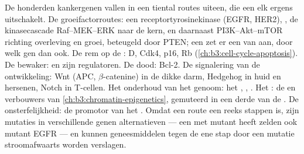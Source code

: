 \begin{proposition}\label{prop:b3:cancer-biology:pathways}
De honderden kankergenen vallen in een tiental routes uiteen, die een
 elk ergens uitschakelt. De groeifactorroutes: een
receptortyrosinekinase (EGFR, HER2), , de kinasecascade
Raf--MEK--ERK naar de kern, en daarnaast PI3K--Akt--mTOR richting
overleving en groei, beteugeld door PTEN; een  zet er een van aan,
door welk gen dan ook. De rem op de :  D, Cdk4, p16, Rb
(\cref{ch:b3:cell-cycle-apoptosis}). De bewaker:  en zijn
regulatoren. De dood: Bcl-2. De signalering van de ontwikkeling: Wnt
(APC, $\beta$-catenine) in de dikke darm, Hedgehog in huid en hersenen,
Notch in T-cellen. Het onderhoud van het genoom: het ,
, . Het : de  en verbouwers van
\cref{ch:b3:chromatin-epigenetics}, gemuteerd in een derde van de
. De onsterfelijkheid: de promotor van het . Omdat een
route een reeks stappen is, zijn mutaties in verschillende genen
alternatieven --- een  met mutant  heeft zelden ook mutant EGFR
--- en kunnen geneesmiddelen tegen de ene stap door een mutatie
stroomafwaarts worden verslagen.
\end{proposition}

